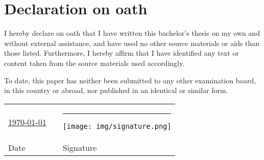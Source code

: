\section*{Declaration on oath}
I hereby declare on oath that I have written this
bachelor’s thesis on my own and without
external assistance, and have used no other source
materials or aids than those listed. Furthermore,
I hereby affirm that I have identified any text or
content taken from the source materials used accordingly.

To date, this paper has neither been submitted to any
other examination board, in this country or abroad,
nor published in an identical or similar form.

\vspace{1.5cm}
\begin{tabular}{p{} m{} p{}}
    \underline{\today} & & \rule{0.25\textwidth}{0.01cm}\hspace{-0.25\textwidth}\texttt{[image: img/signature.png]}\\
    Date               & & Signature
\end{tabular}